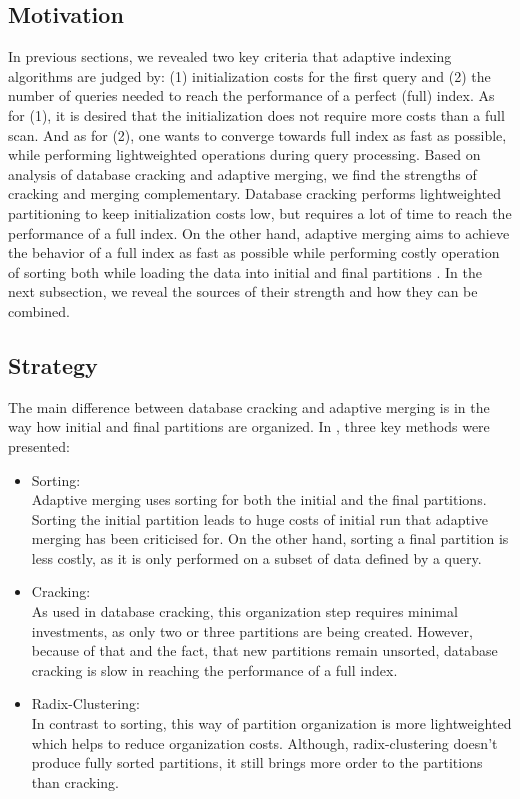 \documentclass[10pt, conference, compsocconf]{IEEEtran}
\begin{document}
\subsection{Motivation}
\label{subsec:hybrid_motiv}
In previous sections, we revealed two key criteria that adaptive indexing algorithms are judged by: (1) initialization costs for the first query and (2) the number of queries needed to reach the performance of a perfect (full) index. As for (1), it is desired that the initialization does not require more costs than a full scan. And as for (2), one wants to converge towards full index as fast as possible, while performing lightweighted operations during query processing. Based on analysis of database cracking and adaptive merging, we find the strengths of cracking and merging complementary. Database cracking performs lightweighted partitioning to keep initialization costs low, but requires a lot of time to reach the performance of a full index. On the other hand, adaptive merging aims to achieve the behavior of a full index as fast as possible while performing costly operation of sorting both while loading the data into initial and final partitions \cite{hybrid}. In the next subsection, we reveal the sources of their strength and how they can be combined.

\subsection{Strategy}
\label{subsec:hybrid_strat}
The main difference between database cracking and adaptive merging is in the way how initial and final partitions are organized. In \cite{hybrid}, three key methods were presented:
\begin{itemize}
\item{Sorting:} \\
Adaptive merging uses sorting for both the initial and the final partitions. Sorting the initial partition leads to huge costs of initial run that adaptive merging has been criticised for. On the other hand, sorting a final partition is less costly, as it is only performed on a subset of data defined by a query.\\
\item{Cracking: } \\
As used in database cracking, this organization step requires minimal investments, as only two or three partitions are being created. However, because of that and the fact, that new partitions remain unsorted, database cracking is slow in reaching the performance of a full index.\\
\item{Radix-Clustering: } \\
In contrast to sorting, this way of partition organization is more lightweighted which helps to reduce organization costs. Although, radix-clustering doesn't produce fully sorted partitions, it still brings more order to the partitions than cracking.\\
\end{itemize}
\end{document}

